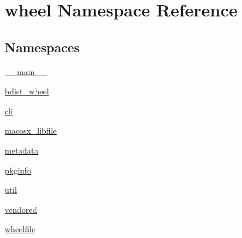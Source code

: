 \hypertarget{namespacewheel}{}\section{wheel Namespace Reference}
\label{namespacewheel}
\subsection*{Namespaces}
\begin{DoxyCompactItemize}
\item 
 \hyperlink{namespacewheel_1_1____main____}{\+\_\+\+\_\+main\+\_\+\+\_\+}
\item 
 \hyperlink{namespacewheel_1_1bdist__wheel}{bdist\+\_\+wheel}
\item 
 \hyperlink{namespacewheel_1_1cli}{cli}
\item 
 \hyperlink{namespacewheel_1_1macosx__libfile}{macosx\+\_\+libfile}
\item 
 \hyperlink{namespacewheel_1_1metadata}{metadata}
\item 
 \hyperlink{namespacewheel_1_1pkginfo}{pkginfo}
\item 
 \hyperlink{namespacewheel_1_1util}{util}
\item 
 \hyperlink{namespacewheel_1_1vendored}{vendored}
\item 
 \hyperlink{namespacewheel_1_1wheelfile}{wheelfile}
\end{DoxyCompactItemize}
